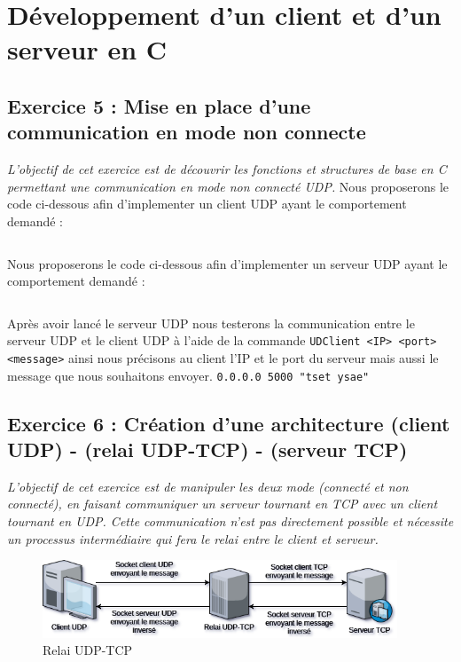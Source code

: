 \section{Développement d’un client et d’un serveur en C}

\subsection{Exercice 5 : Mise en place d’une communication en mode non connecte}
\textit{L’objectif de cet exercice est de découvrir les fonctions et structures de base en C permettant une communication en mode non connecté UDP.}
Nous proposerons le code ci-dessous afin d'implementer un client UDP ayant le comportement demandé :
\inputminted[linenos,firstline=31, lastline=87]{cpp}{../sources/cpp/TP7-8/clientUDP.c}

Nous proposerons le code ci-dessous afin d'implementer un serveur UDP ayant le comportement demandé :
\inputminted[linenos,firstline=34, lastline=104]{cpp}{../sources/cpp/TP7-8/serveurUDP.c}

Après avoir lancé le serveur UDP nous testerons la communication entre le serveur UDP et le client UDP à l'aide de la commande \texttt{UDClient <IP> <port> <message>} ainsi nous précisons au client l'IP et le port du serveur mais aussi le message que nous souhaitons envoyer.
\texttt{0.0.0.0 5000 "tset ysae"}

\subsection{Exercice 6 : Création d’une architecture (client UDP) - (relai UDP-TCP) - (serveur TCP)}
\textit{L'objectif de cet exercice est de manipuler les deux mode (connecté et non connecté), en faisant communiquer un serveur tournant en TCP avec un client tournant en UDP. Cette communication n’est pas directement possible et nécessite un processus intermédiaire qui fera le relai entre le client et serveur.}

\begin{figure}[H]
\centering
\includegraphics[width=300pt]{./cpp/Pictures/tp7+tp8-relay-UDP-TCP}
\caption{Relai UDP-TCP}
\label{Relai UDP-TCP}
\end{figure}

